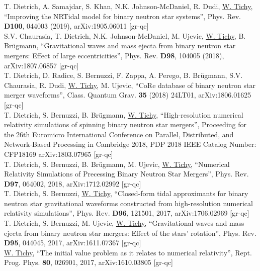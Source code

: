 T. Dietrich, A. Samajdar, S. Khan, N.K. Johnson-McDaniel, R. Dudi, 
\underline{W. Tichy},
``Improving the NRTidal model for binary neutron star systems'',
Phys. Rev. {\bf D100}, 044003 (2019),
arXiv:1905.06011 [gr-qc]
\\

S.V. Chaurasia, T. Dietrich, N.K. Johnson-McDaniel, M. Ujevic,
\underline{W. Tichy}, B. Br\"ugmann,
``Gravitational waves and mass ejecta from binary neutron star mergers:
Effect of large eccentricities'',
Phys. Rev. {\bf D98}, 104005 (2018),
arXiv:1807.06857 [gr-qc]
\\

T. Dietrich, D. Radice, S. Bernuzzi, F. Zappa, A. Perego, B. Br\"ugmann,
S.V. Chaurasia, R. Dudi, \underline{W. Tichy}, M. Ujevic,
``CoRe database of binary neutron star merger waveforms'',
Class. Quantum Grav. {\bf 35} (2018) 24LT01,
arXiv:1806.01625 [gr-qc]
\\

T. Dietrich, S. Bernuzzi, B. Br\"ugmann, \underline{W. Tichy},
``High-resolution numerical relativity simulations of spinning binary
neutron star mergers'',
Proceeding for the 26th Euromicro International Conference on
Parallel, Distributed, and Network-Based Processing
in Cambridge 2018, PDP 2018 IEEE Catalog Number: CFP18169
arXiv:1803.07965 [gr-qc]
\\

T. Dietrich, S. Bernuzzi, B. Br\"ugmann, M. Ujevic, \underline{W. Tichy},
``Numerical Relativity Simulations of Precessing Binary Neutron Star Mergers'',
Phys. Rev. {\bf D97}, 064002, 2018,
arXiv:1712.02992 [gr-qc]
\\

T. Dietrich, S. Bernuzzi, \underline{W. Tichy},
``Closed-form tidal approximants for binary neutron star gravitational
waveforms constructed from high-resolution numerical relativity simulations'',
Phys. Rev. {\bf D96}, 121501, 2017,
arXiv:1706.02969 [gr-qc]
\\

T. Dietrich, S. Bernuzzi, M. Ujevic, \underline{W. Tichy},
``Gravitational waves and mass ejecta from binary neutron star mergers:
Effect of the stars' rotation'',
Phys. Rev. {\bf D95}, 044045, 2017,
arXiv:1611.07367 [gr-qc]
\\

\underline{W. Tichy},
``The initial value problem as it relates to numerical relativity'',
Rept. Prog. Phys. {\bf 80}, 026901, 2017,
arXiv:1610.03805 [gr-qc]
\\

